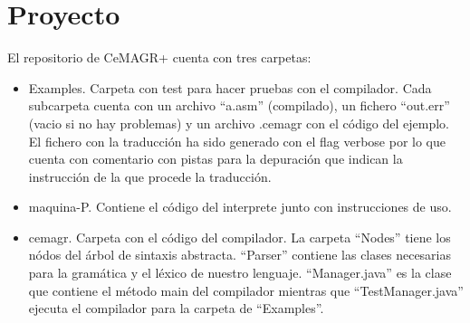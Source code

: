\documentclass[spanish, a4paper, 12pt] {article}
\newcommand{\lname}[0]{CeMAGR+ }
\begin{document}
\section*{Proyecto}
El repositorio de \lname cuenta con tres carpetas:
\begin{itemize}
    \item Examples. Carpeta con test para hacer pruebas con el compilador. Cada subcarpeta cuenta con un archivo ``a.asm'' (compilado), un fichero ``out.err'' (vacio si no hay problemas) y un archivo .cemagr con el código del ejemplo. El fichero con la traducción ha sido generado con el flag verbose por lo que cuenta con comentario con pistas para la depuración que indican la instrucción de la que procede la traducción.
    \item maquina-P. Contiene el código del interprete junto con instrucciones de uso.
    \item cemagr. Carpeta con el código del compilador. La carpeta ``Nodes'' tiene los nódos del árbol de sintaxis abstracta. ``Parser'' contiene las clases necesarias para la gramática y el léxico de nuestro lenguaje. ``Manager.java'' es la clase que contiene el método main del compilador mientras que ``TestManager.java'' ejecuta el compilador para la carpeta de ``Examples''.
\end{itemize}
\end{document}
